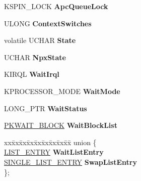 \begin{DoxyCompactItemize}
\begin{tabbing}
\end{tabbing}\item 
\mbox{\label{struct___k_t_h_r_e_a_d_aba8ec5e60f7628893235fd1bbd81638a}} 
K\+S\+P\+I\+N\+\_\+\+L\+O\+CK {\bfseries Apc\+Queue\+Lock}
\item 
\mbox{\label{struct___k_t_h_r_e_a_d_adb9fa2ff1883cb1dc509d390b67ec228}} 
U\+L\+O\+NG {\bfseries Context\+Switches}
\item 
\mbox{\label{struct___k_t_h_r_e_a_d_afbd8cf6e6b7345840a13eac5bef701f9}} 
volatile U\+C\+H\+AR {\bfseries State}
\item 
\mbox{\label{struct___k_t_h_r_e_a_d_a6d5f6d72d787c9aa9fc0b7f4306ddb86}} 
U\+C\+H\+AR {\bfseries Npx\+State}
\item 
\mbox{\label{struct___k_t_h_r_e_a_d_af5113b1f85de6d9e752ef9f84c794752}} 
K\+I\+R\+QL {\bfseries Wait\+Irql}
\item 
\mbox{\label{struct___k_t_h_r_e_a_d_a326b69d5bbf0e439fcefd8906e91a3af}} 
K\+P\+R\+O\+C\+E\+S\+S\+O\+R\+\_\+\+M\+O\+DE {\bfseries Wait\+Mode}
\item 
\mbox{\label{struct___k_t_h_r_e_a_d_a8c0c204088ceaae697ce0d02a28a5000}} 
L\+O\+N\+G\+\_\+\+P\+TR {\bfseries Wait\+Status}
\item 
\mbox{\label{struct___k_t_h_r_e_a_d_ad8fe2c5ac9b99c710419a187a9f7a7d7}} 
\hyperlink{struct___k_w_a_i_t___b_l_o_c_k}{P\+K\+W\+A\+I\+T\+\_\+\+B\+L\+O\+CK} {\bfseries Wait\+Block\+List}
\item 
\mbox{\label{struct___k_t_h_r_e_a_d_a0d1b37d95187f002f7445111b35756de}} 
\begin{tabbing}
xx\=xx\=xx\=xx\=xx\=xx\=xx\=xx\=xx\=\kill
union \{\\
\>\hyperlink{struct___l_i_s_t___e_n_t_r_y}{LIST\_ENTRY} {\bfseries WaitListEntry}\\
\>\hyperlink{struct___s_i_n_g_l_e___l_i_s_t___e_n_t_r_y}{SINGLE\_LIST\_ENTRY} {\bfseries SwapListEntry}\\
\}; \\


\end{tabbing}
\end{DoxyCompactItemize}
